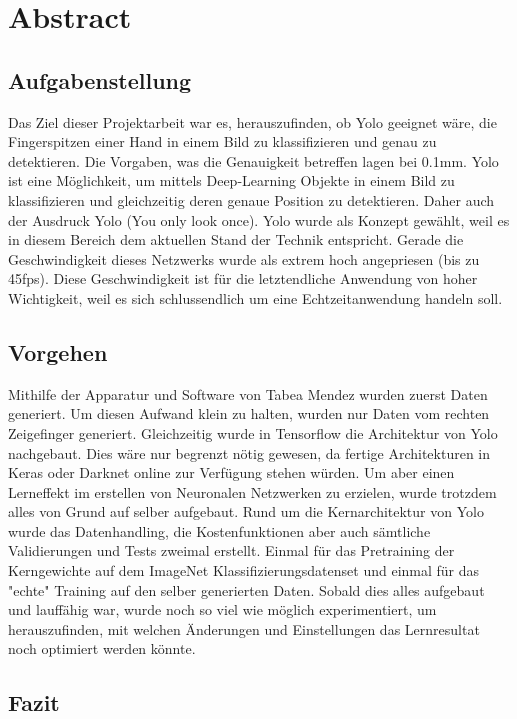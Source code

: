 \newpage
\section{Abstract}
\subsection{Aufgabenstellung}
Das Ziel dieser Projektarbeit war es, herauszufinden, ob Yolo geeignet wäre, die Fingerspitzen einer Hand in einem Bild zu klassifizieren und genau zu detektieren. 
Die Vorgaben, was die Genauigkeit betreffen lagen bei 0.1mm.
Yolo ist eine Möglichkeit, um mittels Deep-Learning Objekte in einem Bild zu klassifizieren und gleichzeitig deren genaue Position zu detektieren. 
Daher auch der Ausdruck Yolo (You only look once).
Yolo wurde als Konzept gewählt, weil es in diesem Bereich dem aktuellen Stand der Technik entspricht. 
Gerade die Geschwindigkeit dieses Netzwerks wurde als extrem hoch angepriesen (bis zu 45fps).
Diese Geschwindigkeit ist für die letztendliche Anwendung von hoher Wichtigkeit, weil es sich schlussendlich um eine Echtzeitanwendung handeln soll. 

\subsection{Vorgehen}
Mithilfe der Apparatur und Software von Tabea Mendez wurden zuerst Daten generiert. 
Um diesen Aufwand klein zu halten, wurden nur Daten vom rechten Zeigefinger generiert. 
Gleichzeitig wurde in Tensorflow die Architektur von Yolo nachgebaut. 
Dies wäre nur begrenzt nötig gewesen, da fertige Architekturen in Keras oder Darknet online zur Verfügung stehen würden. 
Um aber einen Lerneffekt im erstellen von Neuronalen Netzwerken zu erzielen, wurde trotzdem alles von Grund auf selber aufgebaut. 
Rund um die Kernarchitektur von Yolo wurde das Datenhandling, die Kostenfunktionen aber auch sämtliche Validierungen und Tests zweimal erstellt.  
Einmal für das Pretraining der Kerngewichte auf dem ImageNet Klassifizierungsdatenset und einmal für das "echte" Training auf den selber generierten Daten. 
Sobald dies alles aufgebaut und lauffähig war, wurde noch so viel wie möglich experimentiert, um herauszufinden, mit welchen Änderungen und Einstellungen das Lernresultat noch optimiert werden könnte.    

\subsection{Fazit}

